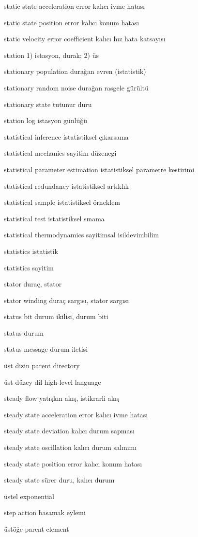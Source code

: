 \documentclass[12pt,fleqn]{article}\usepackage{../../common}
\begin{document}
static state acceleration error kalıcı ivme hatası

static state position error kalıcı konum hatası

static velocity error coefficient kalıcı hız hata katsayısı

station 1) istasyon, durak; 2) üs

stationary population durağan evren (istatistik)

stationary random noise durağan rasgele gürültü

stationary state tutunur duru

station log istasyon günlüğü

statistical inference istatistiksel çıkarsama

statistical mechanics sayitim düzenegi

statistical parameter estimation istatistiksel parametre kestirimi

statistical redundancy istatistiksel artıklık

statistical sample istatistiksel örneklem

statistical test istatistiksel sınama

statistical thermodynamics sayitimsal isildevimbilim

statistics istatistik

statistics sayitim

stator duraç, stator

stator winding duraç sargısı, stator sargısı

status bit durum ikilisi, durum biti

status durum

status message durum iletisi

üst dizin parent directory

üst düzey dil high-level language

steady flow yatışkın akış, istikrarli akış

steady state acceleration error kalıcı ivme hatası

steady state deviation kalıcı durum sapması

steady state oscillation kalıcı durum salınımı

steady state position error kalıcı konum hatası

steady state sürer duru, kalıcı durum

üstel exponential

step action basamak eylemi

üstöğe parent element
\end{document}
